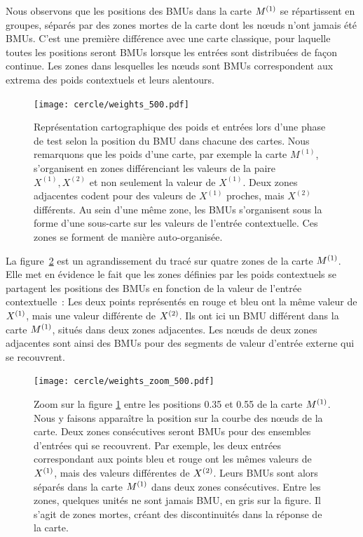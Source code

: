 \documentclass[../main]{subfiles}
\begin{document}
Nous observons que les positions des BMUs dans la carte $M^{({1})}$ se répartissent en groupes, séparés par des zones mortes de la carte dont les n\oe{}uds n'ont jamais été BMUs. 
C'est une première différence avec une carte classique, pour laquelle toutes les positions seront BMUs lorsque les entrées sont distribuées de façon continue. 
Les zones dans lesquelles les n\oe{}uds sont BMUs correspondent aux extrema des poids contextuels et leurs alentours.

\begin{figure}[ht]
	\centering\texttt{[image: cercle/weights\_500.pdf]}
	\caption{Représentation cartographique des poids et entrées lors d'une phase de test selon la position du BMU dans chacune des cartes. Nous remarquons que les poids d'une carte, par exemple la carte $M^{(1)}$, s'organisent en zones différenciant les valeurs de la paire $X^{(1)}, X^{(2)}$ et non seulement la valeur de $X^{(1)}$. 
	Deux zones adjacentes codent pour des valeurs de $X^{(1)}$ proches, mais $X^{(2)}$ différents. 
	Au sein d'une même zone, les BMUs s'organisent sous la forme d'une sous-carte sur les valeurs de l'entrée contextuelle. Ces zones se forment de manière auto-organisée. \label{fig:w}}
\end{figure}

La figure~\ref{fig:w_zoom} est un agrandissement du tracé sur quatre zones de la carte $M^{({1})}$.
Elle met en évidence le fait que les zones définies par les poids contextuels se partagent les positions des BMUs en fonction de la valeur de l'entrée contextuelle~:
Les deux points représentés en rouge et bleu ont la même valeur de $X^{({1})}$, mais une valeur différente de $X^{({2})}$. 
Ils ont ici un BMU différent dans la carte $M^{({1})}$, situés dans deux zones adjacentes.
Les n\oe{}uds de deux zones adjacentes sont ainsi des BMUs pour des segments de valeur d'entrée externe qui se recouvrent.

\begin{figure}[ht]
	\centering\texttt{[image: cercle/weights\_zoom\_500.pdf]}
   \caption{Zoom sur la figure \ref{fig:w} entre les positions 0.35 et 0.55 de la carte $M^{({1})}$. 
   Nous y faisons apparaître la position sur la courbe des n\oe{}uds de la carte.
   Deux zones consécutives seront BMUs pour des ensembles d'entrées qui se recouvrent. Par exemple, les deux entrées correspondant aux points bleu et rouge ont les mêmes valeurs de $X^{({1})}$, mais des valeurs différentes de $X^{({2})}$. Leurs BMUs sont alors séparés dans la carte $M^{({1})}$ dans deux zones consécutives.
   Entre les zones, quelques unités ne sont jamais BMU, en gris sur la figure. Il s'agit de zones mortes, créant des discontinuités dans la réponse de la carte.
   \label{fig:w_zoom}}
\end{figure}
\end{document}
